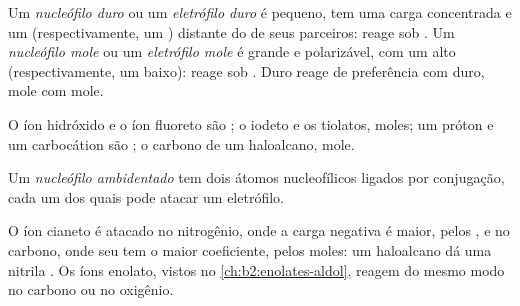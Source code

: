\begin{definition}\label{def:b2:frontier-orbitals:hard-soft}
Um \emph{nucleófilo duro} ou um \emph{eletrófilo duro}
 é pequeno, tem uma carga concentrada e um
 (respectivamente, um ) distante do de seus parceiros: reage sob
. Um \emph{nucleófilo mole} ou um \emph{eletrófilo mole}
 é grande e polarizável, com um  alto
(respectivamente, um  baixo): reage sob . Duro reage de
preferência com duro, mole com mole.
\end{definition}

O íon hidróxido e o íon fluoreto são ; o iodeto e os
tiolatos, moles; um próton e um carbocátion são ; o carbono
de um haloalcano, mole.

\begin{definition}\label{def:b2:frontier-orbitals:ambident}
Um \emph{nucleófilo ambidentado} tem dois átomos
nucleofílicos ligados por conjugação, cada um dos quais pode atacar um eletrófilo.
\end{definition}

O íon cianeto é atacado no nitrogênio, onde a carga negativa é maior, pelos
, e no carbono, onde seu  tem o maior coeficiente, pelos
moles: um haloalcano dá uma nitrila . Os íons enolato, vistos no
\cref{ch:b2:enolates-aldol}, reagem do mesmo modo no carbono ou no oxigênio.

